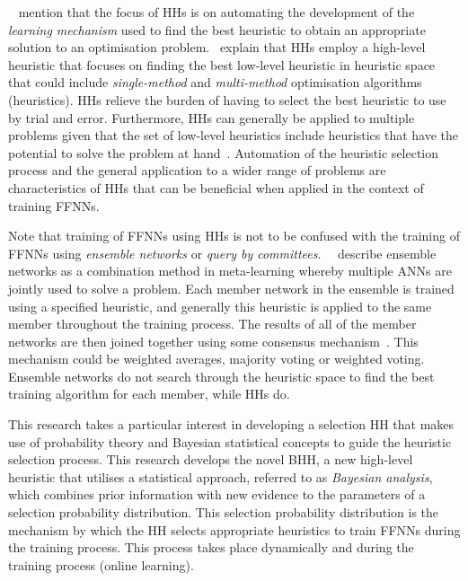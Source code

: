 \citeauthor{ref:grobler:2012}~\cite{ref:grobler:2012} mention that the focus of \acp{HH} is on automating the development of the \textit{learning mechanism} used to find the best heuristic to obtain an appropriate solution to an optimisation problem.~\citeauthor{ref:grobler:2012} explain that \acp{HH} employ a high-level heuristic that focuses on finding the best low-level heuristic in heuristic space that could include \textit{single-method} and \textit{multi-method} optimisation algorithms (heuristics). \acp{HH} relieve the burden of having to select the best heuristic to use by trial and error. Furthermore, \acp{HH} can generally be applied to multiple problems given that the set of low-level heuristics include heuristics that have the potential to solve the problem at hand~\cite{ref:burke:2010}. Automation of the heuristic selection process and the general application to a wider range of problems are characteristics of \acp{HH} that can be beneficial when applied in the context of training \acp{FFNN}.

Note that training of \acp{FFNN} using \acp{HH} is not to be confused with the training of \acp{FFNN} using \textit{ensemble networks} or \textit{query by committees}.~\citeauthor{ref:pappa:2014}~\cite{ref:pappa:2014} describe ensemble networks as a combination method in meta-learning whereby multiple \acp{ANN} are jointly used to solve a problem. Each member network in the ensemble is trained using a specified heuristic, and generally this heuristic is applied to the same member throughout the training process. The results of all of the member networks are then joined together using some consensus mechanism~\cite{ref:zhou:2002}. This mechanism could be weighted averages, majority voting or weighted voting. Ensemble networks do not search through the heuristic space to find the best training algorithm for each member, while \acp{HH} do.

This research takes a particular interest in developing a selection \acs{HH} that makes use of probability theory and Bayesian statistical concepts to guide the heuristic selection process. This research develops the novel \Acf{BHH}, a new high-level heuristic that utilises a statistical approach, referred to as \textit{Bayesian analysis}, which combines prior information with new evidence to the parameters of a selection probability distribution. This selection probability distribution is the mechanism by which the \acs{HH} selects appropriate heuristics to train \acp{FFNN} during the training process. This process takes place dynamically and during the training process (online learning).


